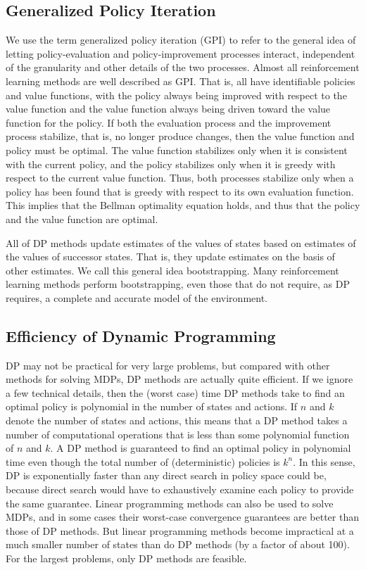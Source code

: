 \documentclass{article}
\begin{document}
\subsection{Generalized Policy Iteration}

We use the term generalized policy iteration (GPI) to refer to the general idea of letting policy-evaluation and policy-improvement processes interact, 
independent of the granularity and other details of the two processes. Almost all reinforcement learning methods are well described as GPI. 
That is, all have identifiable policies and value functions, with the policy always being improved with respect to the value function and the value function always being driven toward the value function for the policy. 
If both the evaluation process and the improvement process stabilize, that is, no longer produce changes, then the value function and policy must be optimal. 
The value function stabilizes only when it is consistent with the current policy, and the policy stabilizes only when it is greedy with respect to the current value function. 
Thus, both processes stabilize only when a policy has been found that is greedy with respect to its own evaluation function. This implies that the Bellman optimality equation holds, and thus that the policy and the value function are optimal.

All of DP methods update estimates of the values of states based on estimates of the values of successor states. That is, they update estimates on the basis of other estimates. 
We call this general idea bootstrapping. Many reinforcement learning methods perform bootstrapping, even those that do not require, as DP requires, a complete and accurate model of the environment.

\subsection{Efficiency of Dynamic Programming}

DP may not be practical for very large problems, but compared with other methods for solving MDPs, DP methods are actually quite efficient. If we ignore a few technical details, 
then the (worst case) time DP methods take to find an optimal policy is polynomial in the number of states and actions. If \(n\) and \(k\) denote the number of states and actions, 
this means that a DP method takes a number of computational operations that is less than some polynomial function of \(n\) and \(k\). A DP method is guaranteed to find an optimal policy in polynomial time even though the total number of (deterministic) policies is \(k^n\). 
In this sense, DP is exponentially faster than any direct search in policy space could be, because direct search would have to exhaustively examine each policy to provide the same guarantee. Linear programming methods can also be used to solve MDPs, 
and in some cases their worst-case convergence guarantees are better than those of DP methods. But linear programming methods become impractical at a much smaller number of states than do DP methods (by a factor of about 100). For the largest problems, only DP methods are feasible.
\end{document}
